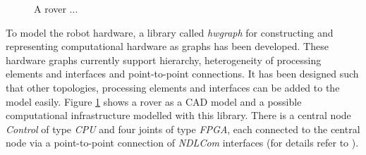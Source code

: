 \documentclass[a4paper,twocolumn]{esapub2005} %
\begin{document}
\begin{figure}[t]
    \centering
    \caption{A rover ...}
    \label{fig:rover_and_model}
\end{figure}
To model the robot hardware, a library called \emph{hwgraph} for constructing and representing computational hardware as graphs has been developed.
These hardware graphs currently support hierarchy, heterogeneity of processing elements and interfaces and point-to-point connections.
It has been designed such that other topologies, processing elements and interfaces can be added to the model easily.
Figure \ref{fig:rover_and_model} shows a rover as a CAD model and a possible computational infrastructure modelled with this library.
There is a central node \emph{Control} of type \emph{CPU} and four joints of type \emph{FPGA},
each connected to the central node via a point-to-point connection of \emph{NDLCom} interfaces (for details refer to \citep{2016_Zenzes}).
\end{document}
